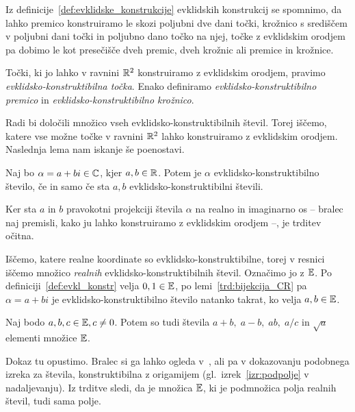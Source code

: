 Iz definicije~\ref{def:evklidske_konstrukcije} evklidskih konstrukcij se spomnimo, da lahko premico konstruiramo le skozi poljubni dve dani točki, krožnico s središčem v poljubni dani točki in poljubno dano točko na njej, točke z evklidskim orodjem pa dobimo le kot presečišče dveh premic, dveh krožnic ali premice in krožnice.

\begin{definicija}
    Točki, ki jo lahko v ravnini $\mathbb R^2$ konstruiramo z evklidskim orodjem, pravimo \emph{evklidsko-konstruktibilna točka}. Enako definiramo \emph{evklidsko-konstruktibilno premico} in \emph{evklidsko-konstruktibilno krožnico}.
\end{definicija}

Radi bi določili množico vseh evklidsko-konstruktibilnih števil. Torej iščemo, katere vse možne točke v ravnini $\mathbb R^2$ lahko konstruiramo z evklidskim orodjem. Naslednja lema nam iskanje še poenostavi.

\begin{lema}
    \label{trd:bijekcija_CR}
    Naj bo $\alpha = a+bi \in \mathbb C$, kjer $a, b \in \mathbb R$. Potem je $\alpha$ evklidsko-konstruktibilno število, če in samo če sta $a, b$ evklidsko-konstruktibilni števili.
\end{lema}
\begin{dokaz}
    Ker sta $a$ in $b$ pravokotni projekciji števila $\alpha$ na realno in imaginarno os -- bralec naj premisli, kako ju lahko konstruiramo z evklidskim orodjem --, je trditev očitna.
\end{dokaz}

Iščemo, katere realne koordinate so evklidsko-konstruktibilne, torej v resnici iščemo množico \emph{realnih} evklidsko-konstruktibilnih števil. Označimo jo z $\mathbb E$. Po definiciji~\ref{def:evkl_konstr} velja $0, 1 \in \mathbb E$, po lemi~\ref{trd:bijekcija_CR} pa $\alpha = a + bi$ je evklidsko-konstruktibilno število natanko takrat, ko velja $a, b \in \mathbb E$.

\begin{trditev}
    Naj bodo $a, b, c \in \mathbb E, c \neq 0$. Potem so tudi števila $a+b, \; a-b, \; ab, \; a/c$ in $\sqrt{a}$ elementi množice $\mathbb E$.
\end{trditev}

Dokaz tu opustimo. Bralec si ga lahko ogleda v~\cite{jerman1998}, \cite[str.\ 165--170]{michael2005} ali pa v dokazovanju podobnega izreka za števila, konstruktibilna z origamijem (gl.\ izrek~\ref{izr:podpolje} v nadaljevanju). Iz trditve sledi, da je množica $\mathbb E$, ki je podmnožica polja realnih števil, tudi sama polje.

